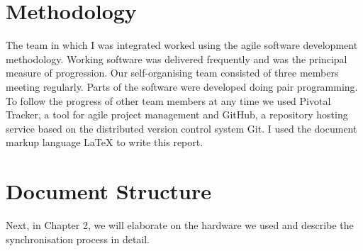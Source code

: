 \section{Methodology}

The team in which I was integrated worked using the agile software development methodology. Working software was delivered frequently and was the principal measure of progression. Our self-organising team consisted of three members meeting regularly. Parts of the software were developed doing pair programming. To follow the progress of other team members at any time we used Pivotal Tracker, a tool for agile project management and GitHub, a repository hosting service based on the distributed version control system Git. I used the document markup language \LaTeX{} to write this report.

\section{Document Structure}

Next, in Chapter 2, we will elaborate on the hardware we used and describe the synchronisation process in detail.

